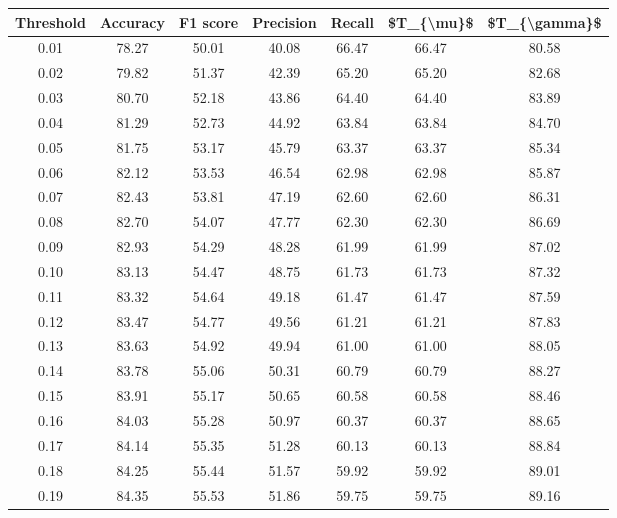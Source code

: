 \begin{tabular}{|c|c|c|c|c|c|c|}
\hline
 Threshold &  Accuracy &  F1 score &  Precision &  Recall &  \$T\_\{\textbackslash mu\}\$ &  \$T\_\{\textbackslash gamma\}\$ \\
\hline
      0.01 &     78.27 &     50.01 &      40.08 &   66.47 &      66.47 &         80.58 \\
      0.02 &     79.82 &     51.37 &      42.39 &   65.20 &      65.20 &         82.68 \\
      0.03 &     80.70 &     52.18 &      43.86 &   64.40 &      64.40 &         83.89 \\
      0.04 &     81.29 &     52.73 &      44.92 &   63.84 &      63.84 &         84.70 \\
      0.05 &     81.75 &     53.17 &      45.79 &   63.37 &      63.37 &         85.34 \\
      0.06 &     82.12 &     53.53 &      46.54 &   62.98 &      62.98 &         85.87 \\
      0.07 &     82.43 &     53.81 &      47.19 &   62.60 &      62.60 &         86.31 \\
      0.08 &     82.70 &     54.07 &      47.77 &   62.30 &      62.30 &         86.69 \\
      0.09 &     82.93 &     54.29 &      48.28 &   61.99 &      61.99 &         87.02 \\
      0.10 &     83.13 &     54.47 &      48.75 &   61.73 &      61.73 &         87.32 \\
      0.11 &     83.32 &     54.64 &      49.18 &   61.47 &      61.47 &         87.59 \\
      0.12 &     83.47 &     54.77 &      49.56 &   61.21 &      61.21 &         87.83 \\
      0.13 &     83.63 &     54.92 &      49.94 &   61.00 &      61.00 &         88.05 \\
      0.14 &     83.78 &     55.06 &      50.31 &   60.79 &      60.79 &         88.27 \\
      0.15 &     83.91 &     55.17 &      50.65 &   60.58 &      60.58 &         88.46 \\
      0.16 &     84.03 &     55.28 &      50.97 &   60.37 &      60.37 &         88.65 \\
      0.17 &     84.14 &     55.35 &      51.28 &   60.13 &      60.13 &         88.84 \\
      0.18 &     84.25 &     55.44 &      51.57 &   59.92 &      59.92 &         89.01 \\
      0.19 &     84.35 &     55.53 &      51.86 &   59.75 &      59.75 &         89.16 \\

\end{tabular}
